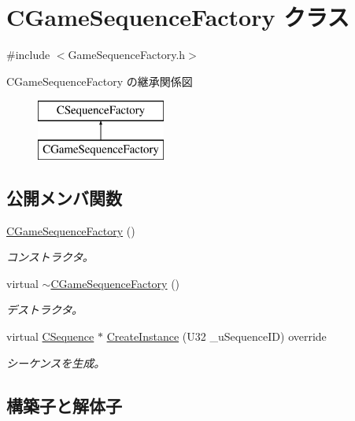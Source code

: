 \hypertarget{class_c_game_sequence_factory}{}\section{C\+Game\+Sequence\+Factory クラス}
\label{class_c_game_sequence_factory}


{\ttfamily \#include $<$Game\+Sequence\+Factory.\+h$>$}

C\+Game\+Sequence\+Factory の継承関係図\begin{figure}[H]
\begin{center}
\leavevmode
\includegraphics[height=2.000000cm]{class_c_game_sequence_factory}
\end{center}
\end{figure}
\subsection*{公開メンバ関数}
\begin{DoxyCompactItemize}
\item 
\hyperlink{class_c_game_sequence_factory_a8ee16d920fba7096edf2dbbb6d451b90}{C\+Game\+Sequence\+Factory} ()
\begin{DoxyCompactList}\small\item\em コンストラクタ。 \end{DoxyCompactList}\item 
virtual \hyperlink{class_c_game_sequence_factory_aff2ca8de400e77e24f59a1748e515187}{$\sim$\+C\+Game\+Sequence\+Factory} ()
\begin{DoxyCompactList}\small\item\em デストラクタ。 \end{DoxyCompactList}\item 
virtual \hyperlink{class_c_sequence}{C\+Sequence} $\ast$ \hyperlink{class_c_game_sequence_factory_a868862261fd54f2d6f05a7fd0ba41b34}{Create\+Instance} (U32 \+\_\+u\+Sequence\+I\+D) override
\begin{DoxyCompactList}\small\item\em シーケンスを生成。 \end{DoxyCompactList}\end{DoxyCompactItemize}


\subsection{構築子と解体子}
\hypertarget{class_c_game_sequence_factory_a8ee16d920fba7096edf2dbbb6d451b90}{}
